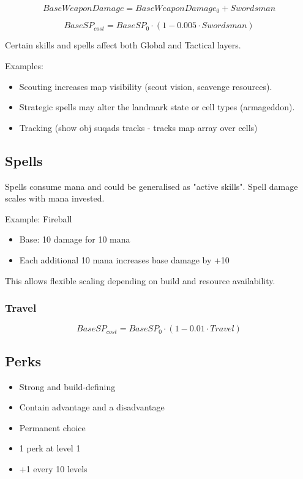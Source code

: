 \documentclass[a4paper,12pt]{article}
\begin{document}
\begin{equation}
BaseWeaponDamage = BaseWeaponDamage_0 + Swordsman
\end{equation}

\begin{equation}
BaseSP_{cost} = BaseSP_{0} \cdot (1 - 0.005 \cdot Swordsman)
\end{equation}

Certain skills and spells affect both Global and Tactical layers.

Examples:

\begin{itemize}
\item Scouting increases map visibility (scout vision, scavenge resources).
\item Strategic spells may alter the landmark state or cell types (armageddon).
\item Tracking (show obj suqads tracks - tracks map array over cells)
\end{itemize}


\subsection{Spells}

Spells consume mana and could be generalised as "active skills".
Spell damage scales with mana invested.

Example: Fireball

\begin{itemize}
\item Base: 10 damage for 10 mana
\item Each additional 10 mana increases base damage by +10
\end{itemize}

This allows flexible scaling depending on build and resource availability.


\subsubsection{Travel}

\begin{equation}
BaseSP_{cost} = BaseSP_{0} \cdot (1 - 0.01 \cdot Travel)
\end{equation}


\subsection{Perks}

\begin{itemize}
\item Strong and build-defining
\item Contain advantage and a disadvantage
\item Permanent choice
\item 1 perk at level 1
\item +1 every 10 levels
\end{itemize}
\end{document}
